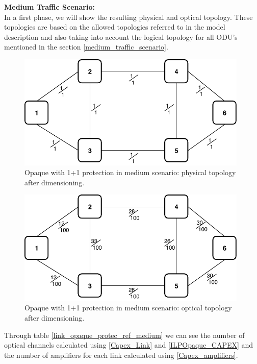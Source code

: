 \textbf{Medium Traffic Scenario:}\\

In a first phase, we will show the resulting physical and optical topology. These topologies are based on the allowed topologies referred to in the model description and also taking into account the logical topology for all ODU's mentioned in the section \ref{medium_traffic_scenario}.\\

\begin{figure}[h!]
\centering
\includegraphics[width=11cm]{sdf/ilp/opaque_protection/figures/physical_topology}
\caption{Opaque with 1+1 protection in medium scenario: physical topology after dimensioning.}
\label{physical_protectionmedium}
\end{figure}
\newpage
\begin{figure}[h!]
\centering
\includegraphics[width=11cm]{sdf/ilp/opaque_protection/figures/optical_topology_medium}
\caption{Opaque with 1+1 protection in medium scenario: optical topology after dimensioning.}
\label{optical_protectionmedium}
\end{figure}

Through table \ref{link_opaque_protec_ref_medium} we can see the number of optical channels calculated using \ref{Capex_Link} and \ref{ILPOpaque_CAPEX} and the number of amplifiers for each link calculated using \ref{Capex_amplifiers}.

